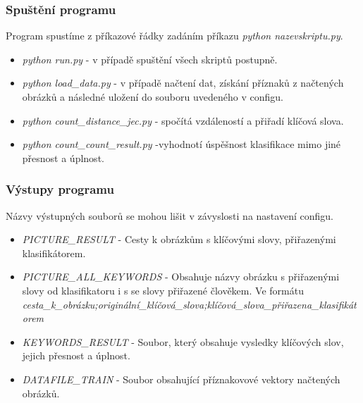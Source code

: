 \documentclass[czech,BP]{thesiskiv}
\begin{document}
\subsubsection{Spuštění programu}
Program spustíme z příkazové řádky zadáním příkazu \textit{python nazevskriptu.py}. 
\begin{itemize}
	\item \textit{python run.py} - v případě spuštění všech skriptů postupně.
	\item \textit{python load\_data.py} - v případě načtení dat, získání příznaků z načtených obrázků a následné uložení do souboru uvedeného v configu.
	\item \textit{python count\_distance\_jec.py} - spočítá vzdáleností a přiřadí klíčová slova.
	\item \textit{python count\_count\_result.py} -vyhodnotí úspěšnost klasifikace mimo jiné přesnost a úplnost.
\end{itemize}

\subsubsection{Výstupy programu}
Názvy výstupných souborů se mohou lišit v závyslosti na nastavení configu.
\begin{itemize}
	\item \textit{PICTURE\_RESULT} - Cesty k obrázkům s klíčovými slovy, přiřazenými klasifikátorem.
	\item \textit{PICTURE\_ALL\_KEYWORDS} - Obsahuje názvy obrázku s přiřazenými slovy od klasifikatoru i s se slovy přiřazené člověkem. Ve formátu \textit{cesta\_k\_obrázku;originální\_klíčová\_slova;klíčová\_slova\_přiřazena\_klasifikátorem}
	\item \textit{KEYWORDS\_RESULT} - Soubor, který obsahuje vysledky klíčových slov, jejich přesnost a úplnost.
	\item \textit{DATAFILE\_TRAIN} - Soubor obsahující příznakovové vektory načtených obrázků. 
\end{itemize}
		
\end{document}
